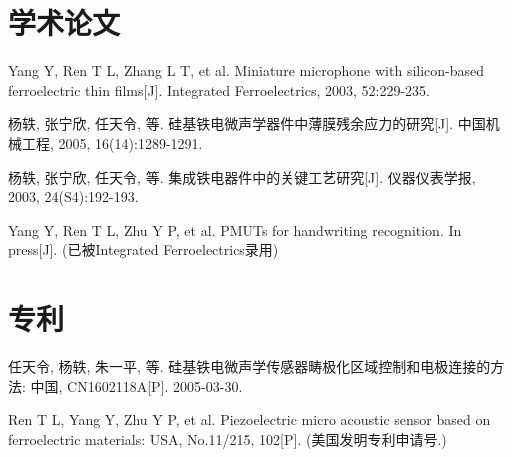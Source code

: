 
\begin{resume}







  \section*{学术论文}

  \begin{achievements}
    \item Yang Y, Ren T L, Zhang L T, et al. Miniature microphone with silicon-based ferroelectric thin films[J]. Integrated Ferroelectrics, 2003, 52:229-235.
    \item 杨轶, 张宁欣, 任天令, 等. 硅基铁电微声学器件中薄膜残余应力的研究[J]. 中国机械工程, 2005, 16(14):1289-1291.
    \item 杨轶, 张宁欣, 任天令, 等. 集成铁电器件中的关键工艺研究[J]. 仪器仪表学报, 2003, 24(S4):192-193.
    \item Yang Y, Ren T L, Zhu Y P, et al. PMUTs for handwriting recognition. In press[J]. (已被Integrated Ferroelectrics录用)
  \end{achievements}


  \section*{专利}

  \begin{achievements}
    \item 任天令, 杨轶, 朱一平, 等. 硅基铁电微声学传感器畴极化区域控制和电极连接的方法: 中国, CN1602118A[P]. 2005-03-30.
    \item Ren T L, Yang Y, Zhu Y P, et al. Piezoelectric micro acoustic sensor based on ferroelectric materials: USA, No.11/215, 102[P]. (美国发明专利申请号.)
  \end{achievements}

\end{resume}
